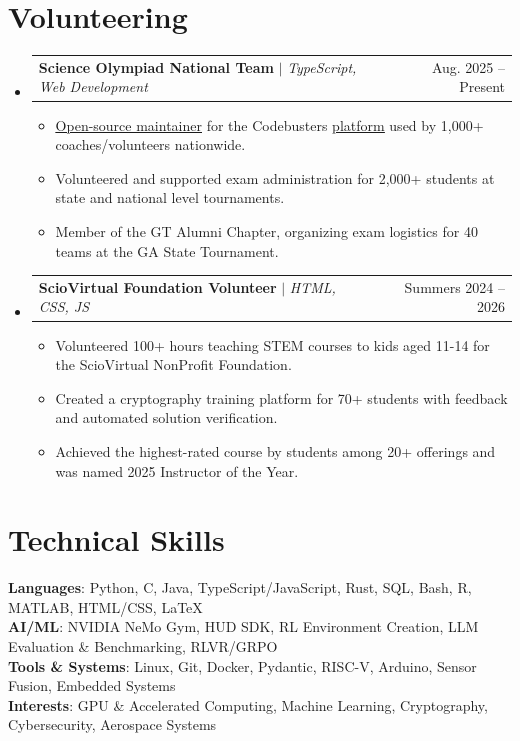 \documentclass[letterpaper,11pt]{article}
\makeatletter
\newcommand{\resumeItem}[1]{
  \item[--]\small{
    {#1 \vspace{-2pt}}
  }
}
\newcommand{\resumeProjectHeading}[2]{
    \item
    \begin{tabular*}{0.97\textwidth}{l@{\extracolsep{\fill}}r}
      \small#1 & #2 \\
    \end{tabular*}\vspace{-7pt}
}
\newcommand{\resumeSubHeadingListStart}{\begin{itemize}[leftmargin=0.15in, label={}]}
\newcommand{\resumeSubHeadingListEnd}{\end{itemize}}
\newcommand{\resumeItemListStart}{\begin{itemize}}
\newcommand{\resumeItemListEnd}{\end{itemize}\vspace{-5pt}}
\makeatother
\begin{document}
\section{Volunteering}
    \resumeSubHeadingListStart
      \resumeProjectHeading
          {\textbf{Science Olympiad National Team} $|$ \emph{TypeScript, Web Development}}{Aug. 2025 -- Present}
          \resumeItemListStart
            \resumeItem{\href{https://github.com/toebes/ciphers}{\underline{Open-source maintainer}} for the Codebusters \href{https://toebes.com/codebusters/}{\underline{platform}} used by 1,000+ coaches/volunteers nationwide.}
            \resumeItem{Volunteered and supported exam administration for 2,000+ students at state and national level tournaments.}
            \resumeItem{Member of the GT Alumni Chapter, organizing exam logistics for 40 teams at the GA State Tournament.}
          \resumeItemListEnd
      \resumeProjectHeading{\textbf{ScioVirtual Foundation Volunteer} $|$ \emph{HTML, CSS, JS}}{Summers 2024 -- 2026}
      \resumeItemListStart
        \resumeItem{Volunteered 100+ hours teaching STEM courses to kids aged 11-14 for the ScioVirtual NonProfit Foundation.}
        \resumeItem{Created a cryptography training platform for 70+ students with feedback and automated solution verification.}
        \resumeItem{Achieved the highest-rated course by students among 20+ offerings and was named 2025 Instructor of the Year.}
\resumeItemListEnd
\resumeSubHeadingListEnd
%
\section{Technical Skills}
 \begin{itemize}[leftmargin=0.15in, label={}]
    \small{\item{
     \textbf{Languages}{: Python, C, Java, TypeScript/JavaScript, Rust, SQL, Bash, R, MATLAB, HTML/CSS, \LaTeX} \\
     \textbf{AI/ML}{: NVIDIA NeMo Gym, HUD SDK, RL Environment Creation, LLM Evaluation \& Benchmarking, RLVR/GRPO} \\
     \textbf{Tools \& Systems}{: Linux, Git, Docker, Pydantic, RISC-V, Arduino, Sensor Fusion, Embedded Systems} \\
     \textbf{Interests}{: GPU \& Accelerated Computing, Machine Learning, Cryptography, Cybersecurity, Aerospace Systems}
    }}
 \end{itemize}


\end{document}
